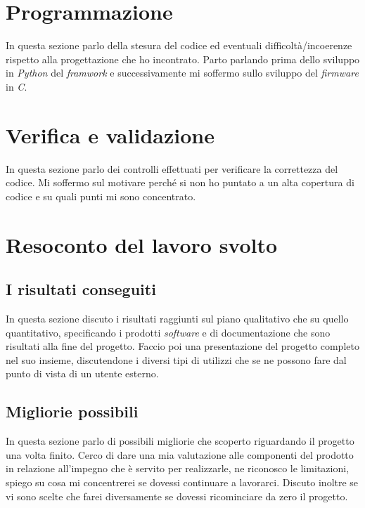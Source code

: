 \section{Programmazione}
\noindent
In questa sezione parlo della stesura del codice ed eventuali difficoltà/incoerenze rispetto alla progettazione che ho incontrato.
Parto parlando prima dello sviluppo in \textit{Python} del \textit{framwork} e successivamente mi soffermo sullo sviluppo del \textit{firmware} in \textit{C}.

\section{Verifica e validazione}
\noindent
In questa sezione parlo dei controlli effettuati per verificare la correttezza del codice.
Mi soffermo sul motivare perché si non ho puntato a un alta copertura di codice e su quali punti mi sono concentrato.

\section{Resoconto del lavoro svolto}
\subsection{I risultati conseguiti}
\noindent
In questa sezione discuto i risultati raggiunti sul piano qualitativo che su quello quantitativo, specificando i prodotti \textit{software} e di documentazione che sono risultati alla fine del progetto.
Faccio poi una presentazione del progetto completo nel suo insieme, discutendone i diversi tipi di utilizzi che se ne possono fare dal punto di vista di un utente esterno.

\subsection{Migliorie possibili}
\noindent
In questa sezione parlo di possibili migliorie che scoperto riguardando il progetto una volta finito.
Cerco di dare una mia valutazione alle componenti del prodotto in relazione all'impegno che è servito per realizzarle, ne riconosco le limitazioni, spiego su cosa mi concentrerei se dovessi continuare a lavorarci.
Discuto inoltre se vi sono scelte che farei diversamente se dovessi ricominciare da zero il progetto.
